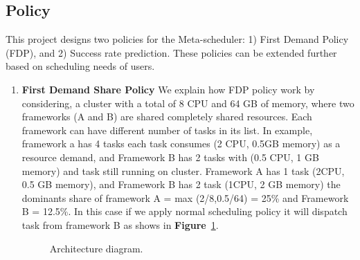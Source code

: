 \documentclass[12pt,oneside,openright,a4paper]{cpe-english-project}
\begin{document}
\newpage
\subsection{Policy}  

\hspace{10mm}This project designs two policies for the Meta-scheduler: 1) First Demand Policy (FDP), and 2) Success rate prediction. These policies can be extended further based on scheduling needs of users. 

\begin{enumerate}
  \item \textbf{First Demand Share Policy} We explain how FDP policy work by considering, a cluster with a total of 8 CPU and 64 GB of memory, where two frameworks (A and B) are shared completely shared resources. Each framework can have different number of tasks in its list. In example, framework a has 4 tasks each task consumes (2 CPU, 0.5GB memory) as a resource demand, and Framework B has 2 tasks with (0.5 CPU, 1 GB memory) and task still running on cluster. Framework A has 1 task (2CPU, 0.5 GB memory), and Framework B has 2 task (1CPU, 2 GB memory) the dominants share of framework A = max (2/8,0.5/64) = 25\% and Framework B = 12.5\%. In this case if we apply normal scheduling policy it will dispatch task from framework B as shows in \textbf{Figure}~\ref{fig:flowDiagram}.

\begin{figure}[!h]\centering
   \setlength{\fboxrule}{0mm} %
   \setlength{\fboxsep}{0cm}
   \caption{Architecture diagram.}\label{fig:flowDiagram}
\end{figure}


\end{enumerate}
\end{document}
